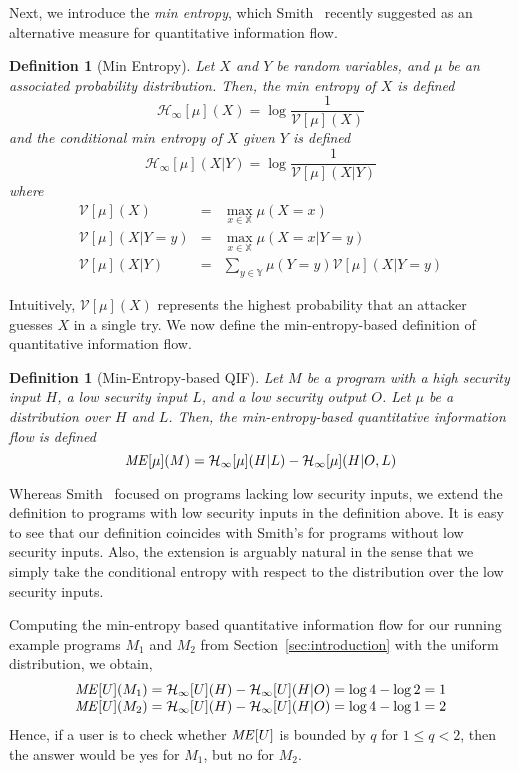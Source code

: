 \documentclass{llncs}
\newtheorem{definition}[theorem]{Definition}
\begin{document}
Next, we introduce the {\em min entropy}, which Smith~\cite{smith09}
recently suggested as an alternative measure for quantitative information
flow.
\begin{definition}[Min Entropy]
Let $X$ and $Y$ be random variables, and $\mu$ be an associated probability
distribution.  Then, the min entropy of $X$ is defined
\[
\mathcal{H}_\infty[\mu](X)=\log\frac{1}{\mathcal{V}[\mu](X)}
\]
and the conditional min entropy of $X$ given $Y$ is defined
\[
\mathcal{H}_\infty[\mu](X|Y)=\log\frac{1}{\mathcal{V}[\mu](X|Y)}
\]
where
\[
\begin{array}{rcl}
\mathcal{V}[\mu](X)&=&\max_{x\in\mathbb X} \mu(X=x)\\
\mathcal{V}[\mu](X|Y=y)&=&\max_{x\in\mathbb X} \mu(X=x|Y=y)\\
\mathcal{V}[\mu](X|Y)&=&\sum_{y\in\mathbb Y} \mu(Y=y) \mathcal{V}[\mu](X|Y=y)
\end{array}
\]
\end{definition}

\begin{sloppypar}
Intuitively, $\mathcal{V}[\mu](X)$ represents the highest probability
that an attacker guesses $X$ in a single try.  We now define the
min-entropy-based definition of quantitative information flow.
\end{sloppypar}

\begin{definition}[Min-Entropy-based QIF]
\label{def:me}
Let $M$ be a program with a high security input $H$, a low security input
$L$, and a low security output $O$.  Let $\mu$ be a distribution over
$H$ and $L$.  Then, the min-entropy-based quantitative information
flow is defined
\[
{\it ME}[\mu](M)=\mathcal{H}_\infty[\mu](H|L)-\mathcal{H}_\infty[\mu](H|O,L)
\]
\end{definition}

Whereas Smith~\cite{smith09} focused on programs lacking low security
inputs, we extend the definition to programs with low security inputs
in the definition above.  It is easy to see that our definition
coincides with Smith's for programs without low security
inputs.  Also, the extension is arguably natural in the sense that we simply
take the conditional entropy with respect to the distribution over the
low security inputs.

Computing the min-entropy based quantitative information flow for our
running example programs $M_1$ and $M_2$ from
Section~\ref{sec:introduction} with the uniform distribution, we
obtain,
\[
\begin{array}{l}
{\it ME}[U](M_1)=\mathcal{H}_\infty[U](H)-\mathcal{H}_\infty[U](H|O)
=\log 4-\log 2
=1\\
{\it ME}[U](M_2)=\mathcal{H}_\infty[U](H)-\mathcal{H}_\infty[U](H|O)
=\log 4 -\log 1
=2
\end{array}
\]
Hence, if a user is to check whether ${\it ME}[U]$ is bounded by $q$
for $1 \leq q < 2$, then the answer would be yes for $M_1$, but no for
$M_2$.
\end{document}
